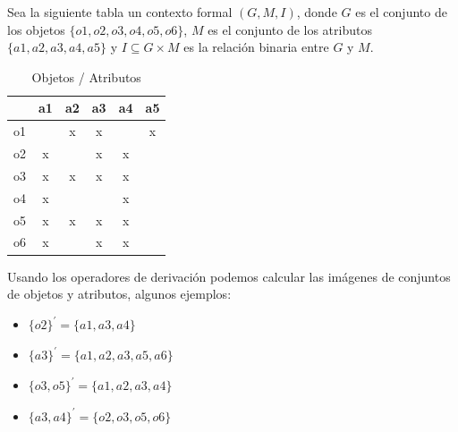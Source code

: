 \documentclass[../../main.tex]{subfiles}
\begin{document}
Sea la siguiente tabla un contexto formal $(G, M, I)$, donde $G$ es el conjunto de los objetos $\{ o1, o2, o3, o4, o5, o6 \}$, 
$M$ es el conjunto de los atributos $\{ a1, a2, a3, a4, a5 \}$ y $I \subseteq G \times M$ es la relación binaria entre $G$ y $M$.

\begin{table}[H]
    \begin{center}
    \begin{tabular}{|c|c|c|c|c|c|}
    \hline
    \multicolumn{1}{|l|}{} & \multicolumn{1}{l|}{a1} & \multicolumn{1}{l|}{a2} & \multicolumn{1}{l|}{a3} & \multicolumn{1}{l|}{a4} & \multicolumn{1}{l|}{a5} \\ \hline
    o1                     &                         & x                       & x                       &                         & x                       \\ \hline
    o2                     & x                       &                         & x                       & x                       &                         \\ \hline
    o3                     & x                       & x                       & x                       & x                       &                         \\ \hline
    o4                     & x                       &                         &                         & x                       &                         \\ \hline
    o5                     & x                       & x                       & x                       & x                       &                         \\ \hline
    o6                     & x                       &                         & x                       & x                       &                         \\ \hline
    \end{tabular}
    \end{center}
    \caption{Objetos / Atributos}
\end{table}

Usando los operadores de derivación podemos calcular las imágenes de conjuntos de objetos y atributos, algunos ejemplos:

\begin{itemize}
    \item $\{ o2 \}^{'} = \{ a1, a3, a4 \}$ 
    \item $\{ a3 \}^{'} = \{ a1, a2, a3, a5, a6 \}$ 
    \item $\{ o3, o5 \}^{'} = \{ a1, a2, a3, a4 \}$ 
    \item $\{ a3, a4 \}^{'} = \{ o2, o3, o5, o6 \}$ 
\end{itemize}
\end{document}
